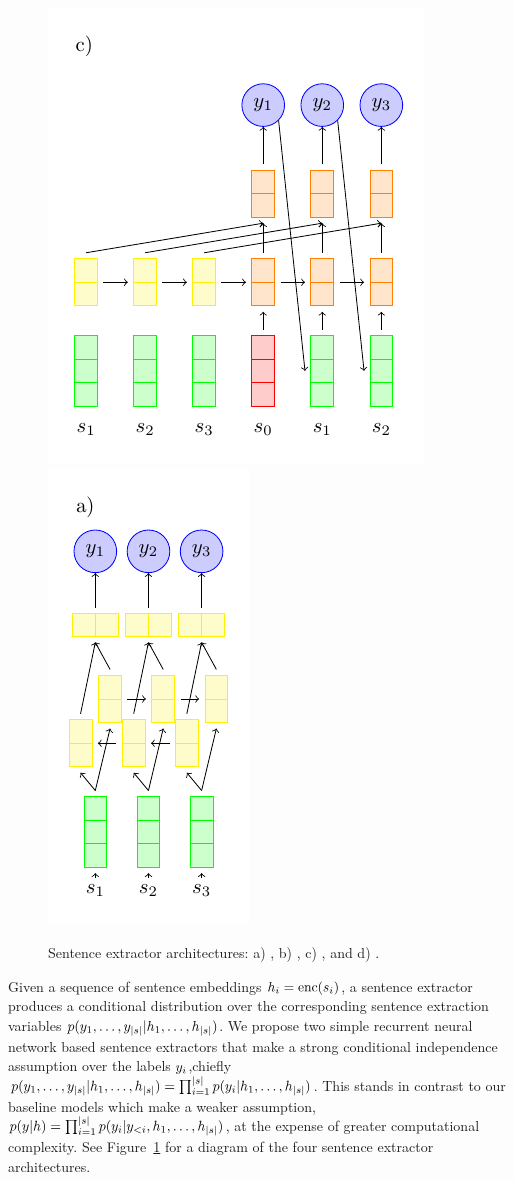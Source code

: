 \begin{figure}
  \includegraphics[scale=.7]{figures/clextractor.pdf}
  \includegraphics[scale=.7]{figures/rnnextractor.pdf}
  \caption{Sentence extractor architectures: a) \modelOneBF, b) \modelTwoBF,
            c) \baselineOneBF, and d) \baselineTwoBF. }
  \label{fig:extractors}
\end{figure}


Given a sequence of sentence embeddings $h_i = \operatorname{enc}(s_i)$,
a sentence extractor produces a conditional distribution over the 
corresponding sentence extraction variables 
$p(y_1,\ldots,y_{|s|}|h_1, \ldots, h_{|s|})$.
We propose two simple recurrent neural network based sentence extractors
that make a strong conditional independence assumption over the labels
$y_i$,chiefly 
$p(y_1,\ldots,y_{|s|}| h_1, \ldots, h_{|s|})= \prod_{i=1}^{|s|}p(y_i| h_1, \ldots, h_{|s|})$. This stands in contrast to our 
baseline models which make a weaker assumption, 
$p(y|h) = \prod_{i=1}^{|s|} p(y_i|y_{<i}, h_1, \ldots, h_{|s|})$, at the expense of greater 
computational complexity. See Figure~\ref{fig:extractors} for a diagram of the 
four sentence extractor architectures.

